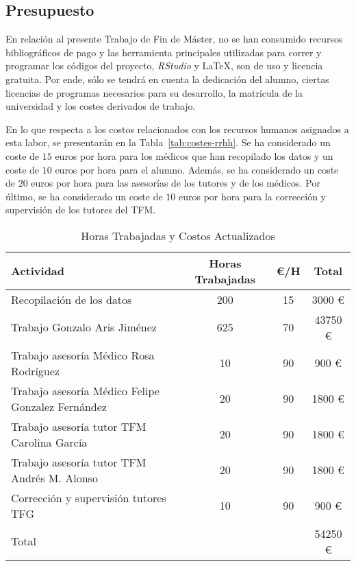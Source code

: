 \subsection{Presupuesto}\label{sec:presupuesto}

En relación al presente Trabajo de Fin de Máster, no se han consumido recursos bibliográficos de pago y las herramienta principales utilizadas para correr y programar los códigos del proyecto, \textit{RStudio} y \LaTeX, son de uso y licencia gratuita. Por ende, sólo se tendrá en cuenta la dedicación del alumno, ciertas licencias de programas necesarios para su desarrollo, la matrícula de la universidad y los costes derivados de trabajo.

En lo que respecta a los costos relacionados con los recursos humanos asignados a esta labor, se presentarán en la Tabla~\ref{tab:costes-rrhh}. Se ha considerado un coste de $15$ euros por hora para los médicos que han recopilado los datos y un coste de $10$ euros por hora para el alumno. Además, se ha considerado un coste de $20$ euros por hora para las asesorías de los tutores y de los médicos. Por último, se ha considerado un coste de $10$ euros por hora para la corrección y supervisión de los tutores del TFM.

\begin{table}[H]
    \centering
    \begin{tabular}{p{5cm}ccc}
    \toprule
    Actividad & Horas Trabajadas & €/H & Total \\
    \midrule
    Recopilación de los datos & 200 & 15 & 3000 € \\
    Trabajo Gonzalo Aris Jiménez & 625 & 70 & 43750 € \\
    Trabajo asesoría Médico Rosa Rodríguez & 10 & 90 & 900 €  \\
    Trabajo asesoría Médico Felipe Gonzalez Fernández & 20 & 90 & 1800 € \\
    Trabajo asesoría tutor TFM Carolina García & 20 & 90 & 1800 € \\
    Trabajo asesoría tutor TFM Andrés M. Alonso & 20 & 90 & 1800 € \\
    Corrección y supervisión tutores TFG & 10 & 90 & 900 € \\
    \midrule
    Total & & & 54250 € \\
    \bottomrule
    \end{tabular}
    \caption{Horas Trabajadas y Costos Actualizados}\label{tab:costes-rrhh-actualizados}
\end{table}



